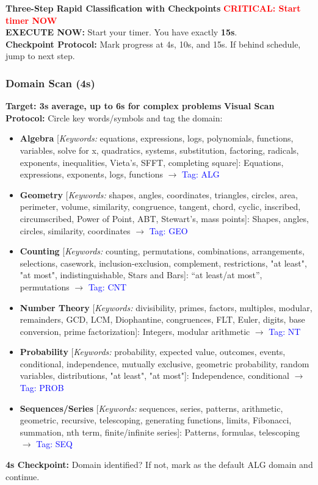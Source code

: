 \documentclass{article}
\newcommand{\immediateaction}[1]{\textbf{\textcolor{classifyred}{#1}}}
\newcommand{\timer}[1]{\textbf{\textcolor{timegreen}{#1}}}
\begin{document}
\begin{classifybox}{\immediateaction{Three-Step Rapid Classification with Checkpoints}}
{\footnotesize\textcolor{timegreen}{}}\quad\textbf{\textcolor{red}{CRITICAL: Start timer NOW}}\\
\immediateaction{EXECUTE NOW:} Start your timer. You have exactly \timer{15s}.\\
\textbf{Checkpoint Protocol:} Mark progress at 4s, 10s, and 15s. If behind schedule, jump to next step.

\subsubsection{Domain Scan (4s)}
{\footnotesize\textcolor{timegreen}{}}\quad\textbf{Target: 3s average, up to 6s for complex problems}
\textbf{Visual Scan Protocol:} Circle key words/symbols and tag the domain:
\begin{itemize}[nosep]
\item \textbf{Algebra} [\textit{Keywords:} equations, expressions, logs, polynomials, functions, variables, solve for x, quadratics, systems, substitution, factoring, radicals, exponents, inequalities, Vieta's, SFFT, completing square]: Equations, expressions, exponents, logs, functions $\rightarrow$ \textcolor{blue}{Tag: ALG}
\item \textbf{Geometry} [\textit{Keywords:} shapes, angles, coordinates, triangles, circles, area, perimeter, volume, similarity, congruence, tangent, chord, cyclic, inscribed, circumscribed, Power of Point, ABT, Stewart's, mass points]: Shapes, angles, circles, similarity, coordinates $\rightarrow$ \textcolor{blue}{Tag: GEO}
\item \textbf{Counting} [\textit{Keywords:} counting, permutations, combinations, arrangements, selections, casework, inclusion-exclusion, complement, restrictions, "at least", "at most", indistinguishable, Stars and Bars]: ``at least/at most'', permutations $\rightarrow$ \textcolor{blue}{Tag: CNT}
\item \textbf{Number Theory} [\textit{Keywords:} divisibility, primes, factors, multiples, modular, remainders, GCD, LCM, Diophantine, congruences, FLT, Euler, digits, base conversion, prime factorization]: Integers, modular arithmetic $\rightarrow$ \textcolor{blue}{Tag: NT}
\item \textbf{Probability} [\textit{Keywords:} probability, expected value, outcomes, events, conditional, independence, mutually exclusive, geometric probability, random variables, distributions, "at least", "at most"]: Independence, conditional $\rightarrow$ \textcolor{blue}{Tag: PROB}
\item \textbf{Sequences/Series} [\textit{Keywords:} sequences, series, patterns, arithmetic, geometric, recursive, telescoping, generating functions, limits, Fibonacci, summation, nth term, finite/infinite series]: Patterns, formulas, telescoping $\rightarrow$ \textcolor{blue}{Tag: SEQ}
\end{itemize}
\textbf{4s Checkpoint:} Domain identified? If not, mark as the default ALG domain and continue.


\end{classifybox}
\end{document}
